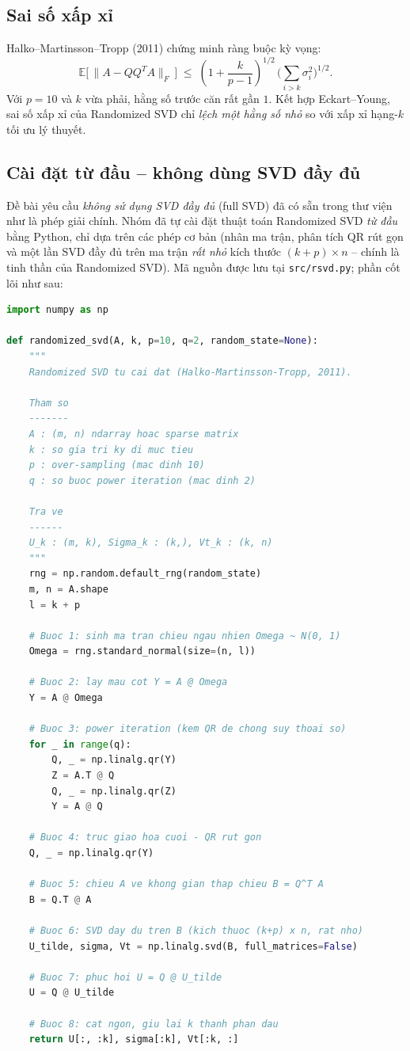 \subsection{Sai số xấp xỉ}

Halko--Martinsson--Tropp (2011) chứng minh ràng buộc kỳ vọng:
\[
\mathbb{E}\big[\,\|A - QQ^T A\|_F\,\big] \;\le\;
\left(1 + \frac{k}{p-1}\right)^{1/2}\,\Big(\sum_{i>k}\sigma_i^2\Big)^{1/2}.
\]
Với $p = 10$ và $k$ vừa phải, hằng số trước căn rất gần $1$. Kết hợp Eckart--Young,
sai số xấp xỉ của Randomized SVD chỉ \emph{lệch một hằng số nhỏ} so với xấp xỉ
hạng-$k$ tối ưu lý thuyết.

\subsection{Cài đặt từ đầu -- không dùng SVD đầy đủ}\label{sec:custom-impl}

Đề bài yêu cầu \emph{không sử dụng SVD đầy đủ} (full SVD) đã có sẵn trong thư
viện như là phép giải chính. Nhóm đã tự cài đặt thuật toán Randomized SVD
\emph{từ đầu} bằng Python, chỉ dựa trên các phép cơ bản (nhân ma trận, phân
tích QR rút gọn và một lần SVD đầy đủ trên ma trận \emph{rất nhỏ} kích thước
$(k+p)\times n$ -- chính là tinh thần của Randomized SVD). Mã nguồn được lưu
tại \texttt{src/rsvd.py}; phần cốt lõi như sau:

\begin{lstlisting}[language=Python]
import numpy as np

def randomized_svd(A, k, p=10, q=2, random_state=None):
    """
    Randomized SVD tu cai dat (Halko-Martinsson-Tropp, 2011).

    Tham so
    -------
    A : (m, n) ndarray hoac sparse matrix
    k : so gia tri ky di muc tieu
    p : over-sampling (mac dinh 10)
    q : so buoc power iteration (mac dinh 2)

    Tra ve
    ------
    U_k : (m, k), Sigma_k : (k,), Vt_k : (k, n)
    """
    rng = np.random.default_rng(random_state)
    m, n = A.shape
    l = k + p

    # Buoc 1: sinh ma tran chieu ngau nhien Omega ~ N(0, 1)
    Omega = rng.standard_normal(size=(n, l))

    # Buoc 2: lay mau cot Y = A @ Omega
    Y = A @ Omega

    # Buoc 3: power iteration (kem QR de chong suy thoai so)
    for _ in range(q):
        Q, _ = np.linalg.qr(Y)
        Z = A.T @ Q
        Q, _ = np.linalg.qr(Z)
        Y = A @ Q

    # Buoc 4: truc giao hoa cuoi - QR rut gon
    Q, _ = np.linalg.qr(Y)

    # Buoc 5: chieu A ve khong gian thap chieu B = Q^T A
    B = Q.T @ A

    # Buoc 6: SVD day du tren B (kich thuoc (k+p) x n, rat nho)
    U_tilde, sigma, Vt = np.linalg.svd(B, full_matrices=False)

    # Buoc 7: phuc hoi U = Q @ U_tilde
    U = Q @ U_tilde

    # Buoc 8: cat ngon, giu lai k thanh phan dau
    return U[:, :k], sigma[:k], Vt[:k, :]
\end{lstlisting}

